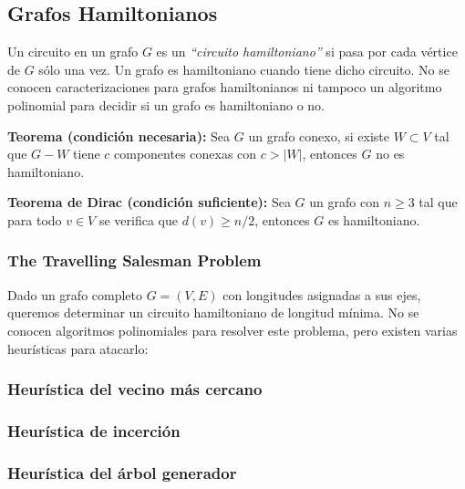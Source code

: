 \newpage
\subsection{Grafos Hamiltonianos}

Un circuito en un grafo $G$ es un \emph{``circuito hamiltoniano''} si pasa por cada v\'ertice de $G$ s\'olo una vez. Un grafo es hamiltoniano cuando tiene dicho circuito. No se conocen caracterizaciones para grafos hamiltonianos ni tampoco un algoritmo polinomial para decidir si un grafo es hamiltoniano o no.

\newenvironment{badidea}
  {\par\leftskip=1cm}
  {\par}

\begin{badidea}
\textbf{Teorema (condici\'on necesaria):} Sea $G$ un grafo conexo, si existe $W \subset V$ tal que $G - W$ tiene $c$ componentes conexas con $c > |W|$, entonces $G$ no es hamiltoniano.
\end{badidea}

\begin{badidea}
\textbf{Teorema de Dirac (condici\'on suficiente):} Sea $G$ un grafo con $n \geq 3$ tal que para todo $v \in V$ se verifica que $d(v) \geq n/2$, entonces $G$ es hamiltoniano.
\end{badidea}

\subsubsection{The Travelling Salesman Problem}

Dado un grafo completo $G = (V, E)$ con longitudes asignadas a sus ejes, queremos determinar un circuito hamiltoniano de longitud m\'inima. No se conocen algoritmos polinomiales para resolver este problema, pero existen varias heur\'isticas para atacarlo:

\subsubsection*{Heur\'istica del vecino m\'as cercano}
\subsubsection*{Heur\'istica de incerci\'on}
\subsubsection*{Heur\'istica del \'arbol generador}